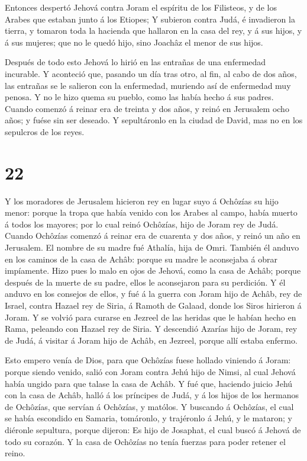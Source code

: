  Entonces despertó Jehová contra Joram el espíritu de los
Filisteos, y de los Arabes que estaban junto á los Etiopes;
 Y subieron contra Judá, é invadieron la tierra, y tomaron
toda la hacienda que hallaron en la casa del rey, y á sus hijos, y á sus
mujeres; que no le quedó hijo, sino Joachâz el menor de sus hijos.

 Después de todo esto Jehová lo hirió en las entrañas de
una enfermedad incurable.  Y aconteció que, pasando un día
tras otro, al fin, al cabo de dos años, las entrañas se le salieron con
la enfermedad, muriendo así de enfermedad muy penosa. Y no le hizo quema
su pueblo, como las había hecho á sus padres.  Cuando
comenzó á reinar era de treinta y dos años, y reinó en Jerusalem ocho
años; y fuése sin ser deseado. Y sepultáronlo en la ciudad de David, mas
no en los sepulcros de los reyes.

\hypertarget{section-21}{%
\section{22}\label{section-21}}

 Y los moradores de Jerusalem hicieron rey en lugar suyo á
Ochôzías su hijo menor: porque la tropa que había venido con los Arabes
al campo, había muerto á todos los mayores; por lo cual reinó Ochôzías,
hijo de Joram rey de Judá.  Cuando Ochôzías comenzó á reinar
era de cuarenta y dos años, y reinó un año en Jerusalem. El nombre de su
madre fué Athalía, hija de Omri.  También él anduvo en los
caminos de la casa de Achâb: porque su madre le aconsejaba á obrar
impíamente.  Hizo pues lo malo en ojos de Jehová, como la
casa de Achâb; porque después de la muerte de su padre, ellos le
aconsejaron para su perdición.  Y él anduvo en los consejos
de ellos, y fué á la guerra con Joram hijo de Achâb, rey de Israel,
contra Hazael rey de Siria, á Ramoth de Galaad, donde los Siros hirieron
á Joram.  Y se volvió para curarse en Jezreel de las heridas
que le habían hecho en Rama, peleando con Hazael rey de Siria. Y
descendió Azarías hijo de Joram, rey de Judá, á visitar á Joram hijo de
Achâb, en Jezreel, porque allí estaba enfermo.

 Esto empero venía de Dios, para que Ochôzías fuese hollado
viniendo á Joram: porque siendo venido, salió con Joram contra Jehú hijo
de Nimsi, al cual Jehová había ungido para que talase la casa de Achâb.
 Y fué que, haciendo juicio Jehú con la casa de Achâb, halló
á los príncipes de Judá, y á los hijos de los hermanos de Ochôzías, que
servían á Ochôzías, y matólos.  Y buscando á Ochôzías, el
cual se había escondido en Samaria, tomáronlo, y trajéronlo á Jehú, y le
mataron; y diéronle sepultura, porque dijeron: Es hijo de Josaphat, el
cual buscó á Jehová de todo su corazón. Y la casa de Ochôzías no tenía
fuerzas para poder retener el reino.


